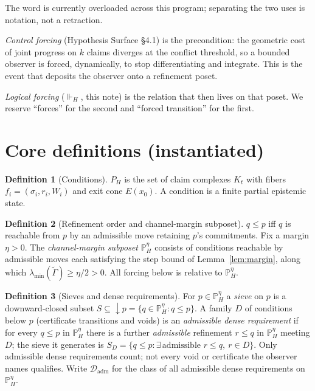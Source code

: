 \documentclass[11pt]{article}
\theoremstyle{definition}
\newtheorem{definition}{Definition}
\theoremstyle{remark}
\newcommand{\forcesH}{\Vdash_{H}}
\newcommand{\PHeta}{\mathbb{P}_{H}^{\eta}}
\newcommand{\refines}{\leq}
\newcommand{\Gam}{\tilde{\Gamma}}
\newcommand{\lmin}{\lambda_{\min}}
\newcommand{\Kt}{K_{t}}
\newcommand{\Dadm}{\mathcal{D}_{\mathrm{adm}}}
\begin{document}
The word is currently overloaded across this program; separating the two uses is notation, not a
retraction.

\emph{Control forcing} (Hypothesis Surface \S4.1) is the precondition: the geometric cost of
joint progress on $k$ claims diverges at the conflict threshold, so a bounded observer is forced,
dynamically, to stop differentiating and integrate. This is the event that deposits the observer
onto a refinement poset.

\emph{Logical forcing} ($\forcesH$, this note) is the relation that then lives on that poset. We
reserve ``forces'' for the second and ``forced transition'' for the first.

\section{Core definitions (instantiated)}

\begin{definition}[Conditions]
$P_H$ is the set of claim complexes $\Kt$ with fibers $f_i=(\sigma_i,r_i,W_i)$ and exit cone
$E(x_0)$. A condition is a finite partial epistemic state.
\end{definition}

\begin{definition}[Refinement order and channel-margin subposet]
$q\refines p$ iff $q$ is reachable from $p$ by an admissible move retaining $p$'s commitments. Fix
a margin $\eta>0$. The \emph{channel-margin subposet} $\PHeta$ consists of conditions reachable by
admissible moves each satisfying the step bound of Lemma~\ref{lem:margin}, along which
$\lmin(\Gam)\ge\eta/2>0$. All forcing below is relative to $\PHeta$.
\end{definition}

\begin{definition}[Sieves and dense requirements]\label{def:req}
For $p\in\PHeta$ a \emph{sieve} on $p$ is a downward-closed subset $S\subseteq{\downarrow}p=\{q\in\PHeta:q\refines p\}$.
A family $D$ of conditions below $p$ (certificate transitions and voids) is an \emph{admissible dense
requirement} if for every $q\refines p$ in $\PHeta$ there is a further \emph{admissible} refinement
$r\refines q$ in $\PHeta$ meeting $D$; the sieve it generates is
$S_D=\{q\refines p:\exists\,\text{admissible }r\refines q,\ r\in D\}$. Only admissible dense
requirements count; not every void or certificate the observer names qualifies. Write $\Dadm$ for the
class of all admissible dense requirements on $\PHeta$.
\end{definition}
\end{document}
